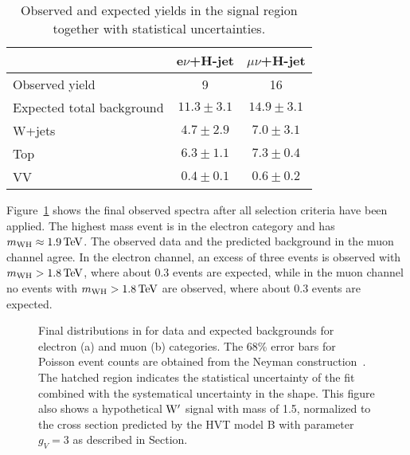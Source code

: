 \begin{table}[!htb]
\centering
\caption{
Observed and expected yields in the signal region together with statistical uncertainties.
}
\label{tab:WHExpectedYields}
\begin{tabular}{lcc}
   & e$\nu$+H-jet & {$\mu\nu$+H-jet}   \\
\hline \hline
 Observed yield     & 9   & 16  \\
 Expected total background   & $11.3 \pm 3.1$  & $14.9 \pm 3.1$   \\
\hline
 W+jets   & $4.7 \pm 2.9$  & $7.0 \pm 3.1$   \\
 Top  & $6.3 \pm 1.1$ & $7.3 \pm 0.4$ \\
 VV   & $0.4 \pm 0.1$  & $0.6 \pm 0.2$   \\
\hline \hline
\end{tabular}
\end{table}

Figure~\ref{fig:mWH-final} shows the final observed \mWH spectra after all selection criteria have been applied.
The highest mass event is in the electron category and has $m_{\rm WH} \approx 1.9\,\text{Te\hspace{-.08em}V}$.
The observed data and the predicted background in the muon channel agree.
In the electron channel, an excess of three events is observed with $m_{\rm WH} > 1.8\,\text{Te\hspace{-.08em}V}$, where about 0.3 events are expected,
while in the muon channel no events with $m_{\rm WH} > 1.8\,\text{Te\hspace{-.08em}V}$ are observed, where about 0.3 events are expected.

\begin{figure}[!htb]
\centering
{}
\caption{
Final distributions in \mWH for data and expected backgrounds for electron (a) and muon (b) categories.
The 68\% error bars for Poisson event counts are obtained from the Neyman construction~\cite{Garwood}. The hatched region indicates the statistical uncertainty of the fit combined with the systematical uncertainty in the shape. This figure also shows a hypothetical $\mathrm{W}^\prime$ signal with mass of 1.5\TeV, normalized to the cross section predicted by the HVT model B with parameter $g_V=3$ as described in Section.
}
\label{fig:mWH-final}
\end{figure}

